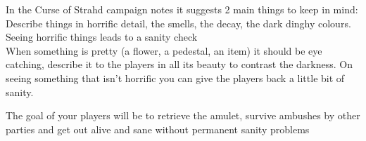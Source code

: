 \documentclass[10pt,twoside,twocolumn]{article}
\begin{document}
\begin{commentbox}
In the Curse of Strahd campaign notes it suggests 2 main things to keep in mind: \\

Describe things in horrific detail, the smells, the decay, the dark dinghy colours. Seeing horrific things leads to a sanity check \\

When something is pretty (a flower, a pedestal, an item) it should be eye catching, describe it to the players in all its beauty to contrast the darkness. On seeing something that isn't horrific you can give the players back a little bit of sanity.
\end{commentbox}

The goal of your players will be to retrieve the amulet, survive ambushes by other parties and get out alive and sane without permanent sanity problems
\end{document}
